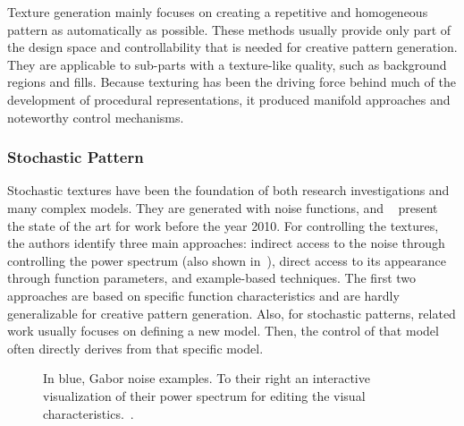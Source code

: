  Texture generation mainly focuses on creating a repetitive and homogeneous pattern as automatically as possible. These methods usually provide only part of the design space and controllability that is needed for creative pattern generation. They are applicable to sub-parts with a texture-like quality, such as background regions and fills. Because texturing has been the driving force behind much of the development of procedural representations, it produced manifold approaches and noteworthy control mechanisms. 

\subsubsection{Stochastic Pattern}
\label{subsubsec:analysis_distribution_and_repetition_stochastic}

Stochastic textures have been the foundation of both research investigations and many complex models. They are generated with noise functions, and \citeauthor*{lagae_2010_sap}~\cite{lagae_2010_sap} present the state of the art for work before the year 2010.  For controlling the textures, the authors identify three main approaches: indirect access to the noise through controlling the power spectrum (also shown in~), direct access to its appearance through function parameters, and example-based techniques. The first two approaches are based on specific function characteristics and are hardly generalizable for creative pattern generation. Also, for stochastic patterns, related work usually focuses on defining a new model. Then, the control of that model often directly derives from that specific model.

\begin{figure}[t]
    \centering
    \caption{\label{fig:galerne_2012_gne}In blue, Gabor noise examples. To their right an interactive visualization of their power spectrum for editing the visual characteristics.~\cite{galerne_2012_gne}.}
\end{figure}

